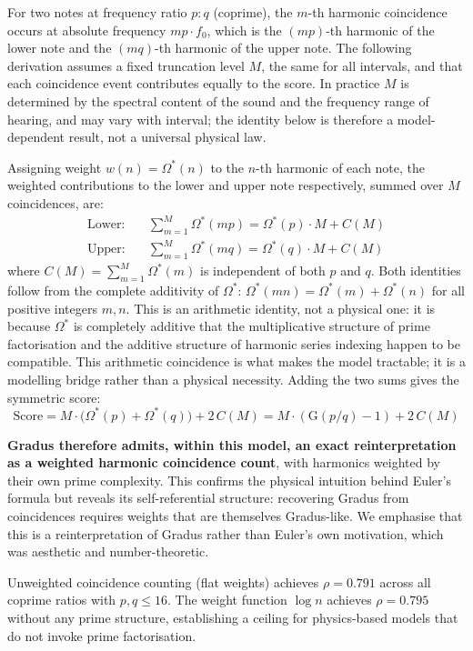 \documentclass[11pt,a4paper]{article}
\newcommand{\Os}{\Omega^{\!*}}
\newcommand{\G}{\mathrm{G}}
\begin{document}
For two notes at frequency ratio $p:q$ (coprime), the $m$-th harmonic
coincidence occurs at absolute frequency $mp \cdot f_0$, which is the
$(mp)$-th harmonic of the lower note and the $(mq)$-th harmonic of the upper
note. The following derivation assumes a fixed truncation level $M$, the same
for all intervals, and that each coincidence event contributes equally to the
score. In practice $M$ is determined by the spectral content of the sound and
the frequency range of hearing, and may vary with interval; the identity below
is therefore a model-dependent result, not a universal physical law.

Assigning weight $w(n) = \Os(n)$ to the $n$-th harmonic of each note,
the weighted contributions to the lower and upper note respectively, summed
over $M$ coincidences, are:
\begin{align*}
  \text{Lower:} &\quad \sum_{m=1}^{M} \Os(m p) = \Os(p)\cdot M + C(M) \\
  \text{Upper:} &\quad \sum_{m=1}^{M} \Os(m q) = \Os(q)\cdot M + C(M)
\end{align*}
where $C(M) = \sum_{m=1}^{M} \Os(m)$ is independent of both $p$ and $q$.
Both identities follow from the complete additivity of $\Os$:
$\Os(mn) = \Os(m) + \Os(n)$ for all positive integers $m, n$.
This is an arithmetic identity, not a physical one: it is because $\Os$ is
completely additive that the multiplicative structure of prime factorisation
and the additive structure of harmonic series indexing happen to be compatible.
This arithmetic coincidence is what makes the model tractable; it is a
modelling bridge rather than a physical necessity.
Adding the two sums gives the symmetric score:
\[
  \text{Score} = M \cdot \bigl(\Os(p) + \Os(q)\bigr) + 2\,C(M)
               = M \cdot (\G(p/q) - 1) + 2\,C(M)
\]

\textbf{Gradus therefore admits, within this model, an exact reinterpretation
as a weighted harmonic coincidence count}, with harmonics weighted by their
own prime complexity. This confirms the physical intuition behind Euler's formula
but reveals its self-referential structure: recovering Gradus from
coincidences requires weights that are themselves Gradus-like. We emphasise
that this is a reinterpretation of Gradus rather than Euler's own
motivation, which was aesthetic and number-theoretic.

Unweighted coincidence counting (flat weights) achieves $\rho = 0.791$ across
all coprime ratios with $p, q \leq 16$. The weight function $\log n$ achieves
$\rho = 0.795$ without any prime structure, establishing a ceiling for
physics-based models that do not invoke prime factorisation.
\end{document}
